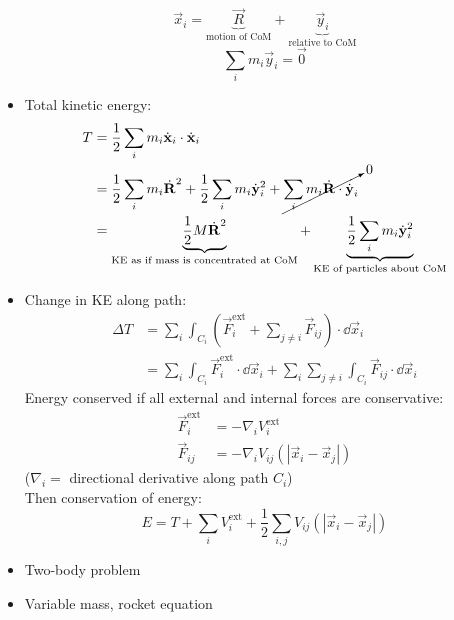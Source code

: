 \begin{itemize}
          \[ \vec{x}_i = \underbrace{\vec{R}}_{\text{motion of CoM}} + \underbrace{\vec{y}_i}_{\text{relative to CoM}}\]
          \[\sum_i m_i \vec{y}_i = \vec{0}\]
    \item Total kinetic energy:
          \begin{align*}
              T & = \frac{1}{2} \sum_i m_i \dot{\vec{x}}_i \cdot \dot{\vec{x}}_i                                                                                                                        \\
                & = \frac{1}{2} \sum_i m_i \dot{\vec{R}}^2 + \frac{1}{2} \sum_i m_i \dot{\vec{y}}_i^2 + \cancelto{0}{\sum_i m_i \dot{\vec{R}} \cdot  \dot{\vec{y}}_i}                                   \\
                & = \underbrace{\frac{1}{2} M \dot{\vec{R}}^2}_{\text{KE as if mass is concentrated at CoM}} + \underbrace{\frac{1}{2} \sum_i m_i \dot{\vec{y}}_i^2}_{\text{KE of particles about CoM}}
          \end{align*}
    \item Change in KE along path:
          \begin{align*}
              \Delta T & = \sum_i \int_{C_i} \left( \vec{F}^{\text{ext}}_i + \sum_{j\neq i} \vec{F}_{ij} \right)\cdot \dd \vec{x}_i                         \\
                       & = \sum_i \int_{C_i} \vec{F}^{\text{ext}}_i \cdot \dd \vec{x}_i + \sum_i \sum_{j\neq i} \int_{C_i} \vec{F}_{ij} \cdot \dd \vec{x}_i
          \end{align*}
          Energy conserved if all external and internal forces are conservative:
          \begin{align*}
              \vec{F}^{\text{ext}}_i & = - \nabla_i V^{\text{ext}}_i              \\
              \vec{F}_{ij}           & = - \nabla_i V_{ij}(|\vec{x}_i-\vec{x}_j|)
          \end{align*}
          ($\nabla_i = $ directional derivative along path $C_i$) \\
          Then conservation of energy: \[E = T+ \sum_i V^{\text{ext}}_i + \frac{1}{2} \sum_{i,j}  V_{ij}(|\vec{x}_i-\vec{x}_j|) \]
    \item Two-body problem
    \item Variable mass, rocket equation


\end{itemize}


